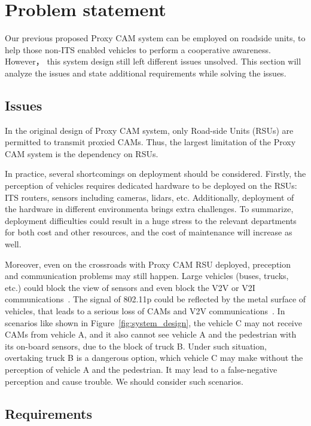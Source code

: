 \section{Problem statement} \label{sec:problem}

Our previous proposed Proxy CAM system can be employed on roadside units,
to help those non-ITS enabled vehicles to perform a cooperative awareness.
However， this system design still left different issues unsolved.
This section will analyze the issues and state additional requirements while solving the issues.

\subsection{Issues}
In the original design of Proxy CAM system, only Road-side Units (RSUs) are permitted to transmit proxied CAMs.
Thus, the largest limitation of the Proxy CAM system is the dependency on RSUs.

In practice, several shortcomings on deployment should be considered.
Firstly, the perception of vehicles requires dedicated hardware to be deployed on the RSUs:
ITS routers, sensors including cameras, lidars, etc.
Additionally, deployment of the hardware in different environmenta brings extra challenges.
To summarize, deployment difficulties could result in a huge stress to the relevant departments for both cost and other resources,
and the cost of maintenance will increase as well.

Moreover, even on the crossroads with Proxy CAM RSU deployed,
preception and communication problems may still happen.
Large vehicles (buses, trucks, etc.) could block the view of sensors and even block the V2V or V2I communications~\cite{d2014empirical}.
The signal of 802.11p could be reflected by the metal surface of vehicles,
that leads to a serious loss of CAMs and V2V communications~\cite{mecklenbrauker2011vehicular}.
In scenarios like shown in Figure~\ref{fig:system_design},
the vehicle C may not receive CAMs from vehicle A,
and it also cannot see vehicle A and the pedestrian with its on-board sensors, due to the block of truck B.
Under such situation, overtaking truck B is a dangerous option, which vehicle C may make without the perception of vehicle A and the pedestrian.
It may lead to a false-negative perception and cause trouble.
We should consider such scenarios.

\subsection{Requirements}

